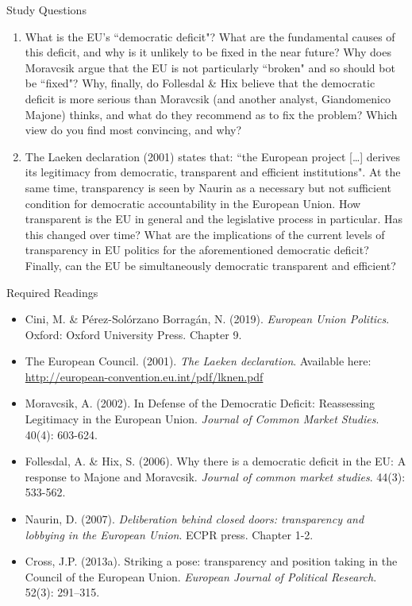 Study Questions

\begin{enumerate}

	\item What is the EU's ``democratic deficit"?  What are the fundamental causes of this deficit, and why is it unlikely to be fixed in the near future? Why does Moravcsik argue that the EU is not particularly ``broken" and so should bot be ``fixed"? Why, finally, do Follesdal \& Hix believe that the democratic deficit is more serious than Moravcsik (and another analyst, Giandomenico Majone) thinks, and what do they recommend as to fix the problem? Which view do you find most convincing, and why?

	\item The Laeken declaration (2001) states that: ``the European project […] derives its legitimacy from democratic, transparent and efficient institutions". At the same time, transparency is seen by Naurin as a necessary but not sufficient condition for democratic accountability in the European Union. How transparent is the EU in general and the legislative process in particular. Has this changed over time? What are the implications of the current levels of transparency in EU politics for the aforementioned democratic deficit? Finally, can the EU be simultaneously democratic transparent and efficient?

\end{enumerate}

\noindent Required Readings

\begin{itemize} 
	\item Cini, M. \& P\'{e}rez-Sol\'{o}rzano Borrag\'{a}n, N. (2019). \textit{European Union Politics}. Oxford: Oxford University Press. Chapter 9.
	\item The European Council. (2001). \textit{The Laeken declaration}. Available here: \url{http://european-convention.eu.int/pdf/lknen.pdf}
	\item Moravcsik, A. (2002). In Defense of the Democratic Deficit: Reassessing Legitimacy in the European Union. \textit{Journal of Common Market Studies}. 40(4): 603-624.
	\item Follesdal, A. \& Hix, S. (2006). Why there is a democratic deficit in the EU: A response to Majone and Moravcsik. \textit{Journal of common market studies}. 44(3): 533-562.
	\item Naurin, D. (2007). \textit{Deliberation behind closed doors: transparency and lobbying in the European Union}. ECPR press. Chapter 1-2.
	\item Cross, J.P. (2013a). Striking a pose: transparency and position taking in the Council of the European Union. \textit{European Journal of Political Research}. 52(3): 291–315.
\end{itemize}

